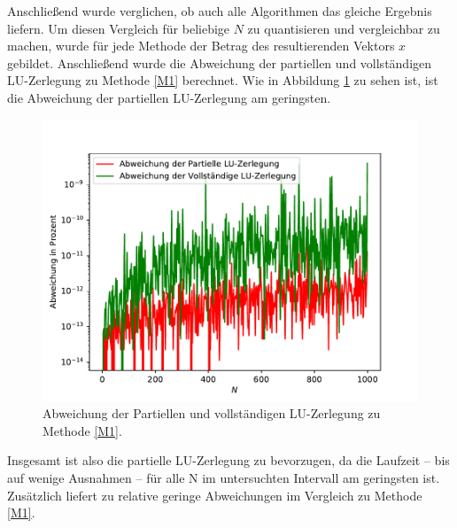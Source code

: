 \documentclass{scrartcl}
\begin{document}
        Anschließend wurde verglichen, ob auch alle Algorithmen das gleiche Ergebnis liefern. Um diesen Vergleich für beliebige $N$ zu quantisieren und vergleichbar zu machen, wurde für jede Methode der Betrag des resultierenden Vektors $x$ gebildet. Anschließend wurde die Abweichung der partiellen und vollständigen LU-Zerlegung zu Methode \ref{M1}  berechnet. Wie in Abbildung \ref{fig:A3devs} zu sehen ist, ist die Abweichung der partiellen LU-Zerlegung am geringsten. 

        \begin{figure}[H]
            \centering
            \includegraphics[scale=0.7]{A3/build/devs.pdf}
            \caption{Abweichung der Partiellen und vollständigen LU-Zerlegung zu Methode \ref{M1}.}
            \label{fig:A3devs}
        \end{figure}

        Insgesamt ist also die partielle LU-Zerlegung zu bevorzugen, da die Laufzeit  – bis auf wenige Ausnahmen  – für alle N im untersuchten Intervall am geringsten ist. Zusätzlich liefert zu relative geringe Abweichungen im Vergleich zu Methode \ref{M1}.
\end{document}
